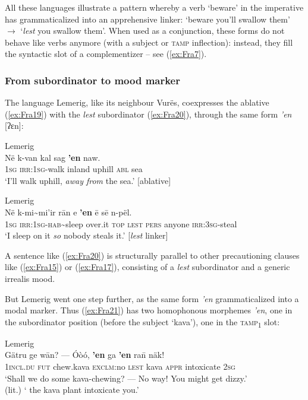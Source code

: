 \documentclass[output=paper,colorlinks,citecolor=brown]{langscibook}
\begin{document}
All these languages illustrate a pattern whereby a verb `beware' in the imperative has grammaticalized into an apprehensive linker: `beware you'll swallow them' $\rightarrow$ `\textit{lest} you swallow them'. When used as a conjunction, these forms do not behave like verbs anymore (with a subject or \textsc{tamp} inflection): instead, they fill the syntactic slot of a complementizer -- see (\ref{ex:Fra7}).
 

\subsubsection{From subordinator to mood marker}
\label{subsubsec:subtomood}

The language Lemerig, like its neighbour Vurës, coexpresses the ablative (\ref{ex:Fra19}) with the \textit{lest} subordinator (\ref{ex:Fra20}), through the same form \textit{'en} [ʔɛn]:

\ea \label{ex:Fra19} \textnormal{Lemerig} \\
\gll Në k-van kal sag \textbf{'en} naw. \\
\textsc{1sg} \textsc{irr:1sg}-walk inland uphill \textsc{abl} sea \\
\glt `I'll walk uphill, \textit{away from} the sea.' \hfill [ablative] 
\z

\ea \label{ex:Fra20} \textnormal{Lemerig}  \\
\gll Në k-mi\textasciitilde mi'ir rān e \textbf{'en} ē sē n-pël. \\
\textsc{1sg} \textsc{irr:1sg}-\textsc{hab}\textasciitilde sleep over.it \textsc{top} \textsc{lest} \textsc{pers} anyone \textsc{irr:3sg}-steal \\
\glt `I sleep on it \textit{so} nobody steals it.' \hfill [\textit{lest} linker] 
\z

\noindent A sentence like (\ref{ex:Fra20}) is structurally parallel to other precautioning clauses like (\ref{ex:Fra15}) or (\ref{ex:Fra17}), consisting of a \textit{lest} subordinator and a generic irrealis mood.

But Lemerig went one step further, as the same form  \textit{'en} grammaticalized into a modal marker. Thus (\ref{ex:Fra21}) has two homophonous morphemes  \textit{'en}, one in the subordinator position (before the subject `kava'), one in the \textsc{tamp}\textsc{\textsubscript{1}} slot:

\ea \label{ex:Fra21} \textnormal{Lemerig} \\
\gll Gätru ge wān? --- Óòó, \textbf{'en} ga \textbf{'en} ra\={n}  näk! \\
\textsc{1incl.du} \textsc{fut} chew.kava {} \textsc{exclm}:no \textsc{lest} kava \textsc{appr} intoxicate \textsc{2sg} \\
\glt `Shall we do some kava-chewing? --- No way!  You might get dizzy.' \\
(lit.) ` the kava plant  intoxicate you.' 
\z
\end{document}
